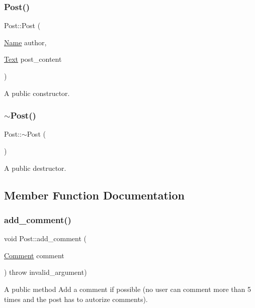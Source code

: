 \subsubsection{\texorpdfstring{Post()}{Post()}}
{\footnotesize\ttfamily Post\+::\+Post (\begin{DoxyParamCaption}\item[{\hyperlink{class_name}{Name}}]{author,  }\item[{\hyperlink{class_text}{Text}}]{post\+\_\+content }\end{DoxyParamCaption})}

A public constructor. \mbox{\label{class_post_a6c1e585c0adb3220a154ba20d2144ae1}} 
\subsubsection{\texorpdfstring{$\sim$\+Post()}{~Post()}}
{\footnotesize\ttfamily Post\+::$\sim$\+Post (\begin{DoxyParamCaption}{ }\end{DoxyParamCaption})}

A public destructor. 

\subsection{Member Function Documentation}
\mbox{\label{class_post_a882ef59148fa556833a68fbdedce58da}} 
\subsubsection{\texorpdfstring{add\+\_\+comment()}{add\_comment()}}
{\footnotesize\ttfamily void Post\+::add\+\_\+comment (\begin{DoxyParamCaption}\item[{\hyperlink{class_comment}{Comment}}]{comment }\end{DoxyParamCaption}) throw  invalid\+\_\+argument) }

A public method Add a comment if possible (no user can comment more than 5 times and the post has to autorize comments). \mbox{\label{class_post_a8172722471012d2a6ede1a0b10c7f756}} 
